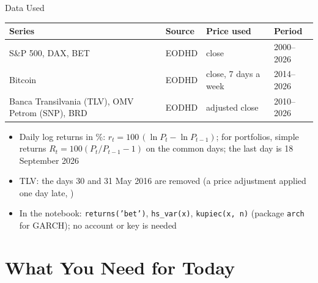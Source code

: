 \begin{frame}{Data Used}
\itemsize{\small}
\begin{center}
\footnotesize
\begin{tabular}{llll}
\toprule
\textbf{Series} & \textbf{Source} & \textbf{Price used} & \textbf{Period} \\
\midrule
S\&P 500, DAX, BET & EODHD & close & 2000--2026 \\
Bitcoin & EODHD & close, 7 days a week & 2014--2026 \\
Banca Transilvania (TLV), OMV Petrom (SNP), BRD & EODHD & adjusted close & 2010--2026 \\
\bottomrule
\end{tabular}
\end{center}
\begin{itemize}
    \item Daily log returns in \%: $r_t = 100\,(\ln P_t - \ln P_{t-1})$; for portfolios, simple returns $R_t = 100(P_t/P_{t-1} - 1)$ on the common days; the last day is 18 September 2026
    \item TLV: the days 30 and 31 May 2016 are removed (a price adjustment applied one day late, )
    \item In the notebook: \texttt{returns('bet')}, \texttt{hs\_var(x)}, \texttt{kupiec(x, n)} (package \texttt{arch} for GARCH); no account or key is needed
\end{itemize}
\end{frame}


\section{What You Need for Today}

